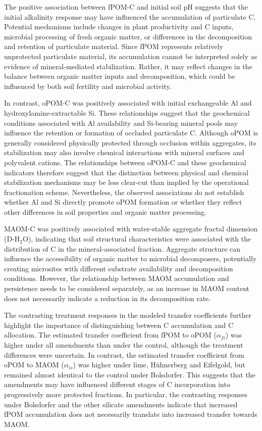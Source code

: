 \documentclass[preprint,12pt]{elsarticle}
\begin{document}
The positive association between fPOM-C and initial soil pH suggests that the initial alkalinity response may have influenced the accumulation of particulate C. Potential mechanisms include changes in plant productivity and C inputs, microbial processing of fresh organic matter, or differences in the decomposition and retention of particulate material. Since fPOM represents relatively unprotected particulate material, its accumulation cannot be interpreted solely as evidence of mineral-mediated stabilization. Rather, it may reflect changes in the balance between organic matter inputs and decomposition, which could be influenced by both soil fertility and microbial activity.

In contrast, oPOM-C was positively associated with initial exchangeable Al and hydroxylamine-extractable Si. These relationships suggest that the geochemical conditions associated with Al availability and Si-bearing mineral pools may influence the retention or formation of occluded particulate C. Although oPOM is generally considered physically protected through occlusion within aggregates, its stabilization may also involve chemical interactions with mineral surfaces and polyvalent cations. The relationships between oPOM-C and these geochemical indicators therefore suggest that the distinction between physical and chemical stabilization mechanisms may be less clear-cut than implied by the operational fractionation scheme. Nevertheless, the observed associations do not establish whether Al and Si directly promote oPOM formation or whether they reflect other differences in soil properties and organic matter processing.

MAOM-C was positively associated with water-stable aggregate fractal dimension (D-H$_2$O), indicating that soil structural characteristics were associated with the distribution of C in the mineral-associated fraction. Aggregate structure can influence the accessibility of organic matter to microbial decomposers, potentially creating microsites with different substrate availability and decomposition conditions. However, the relationship between MAOM accumulation and persistence needs to be considered separately, as an increase in MAOM content does not necessarily indicate a reduction in its decomposition rate.

The contrasting treatment responses in the modeled transfer coefficients further highlight the importance of distinguishing between C accumulation and C allocation. The estimated transfer coefficient from fPOM to oPOM ($\alpha_{fi}$) was higher under all amendments than under the control, although the treatment differences were uncertain. In contrast, the estimated transfer coefficient from oPOM to MAOM ($\alpha_{is}$) was higher under lime, Hühnerberg and Eifelgold, but remained almost identical to the control under Bolsdorfer. This suggests that the amendments may have influenced different stages of C incorporation into progressively more protected fractions. In particular, the contrasting responses under Bolsdorfer and the other silicate amendments indicate that increased fPOM accumulation does not necessarily translate into increased transfer towards MAOM.
\end{document}
